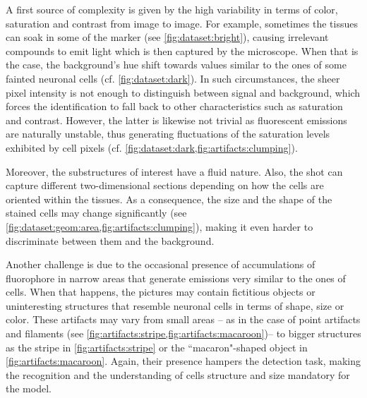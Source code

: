 A first source of complexity is given by the high variability in terms of color, saturation and contrast from image to image.
For example, sometimes the tissues can soak in some of the marker (see \cref{fig:dataset:bright}), causing irrelevant compounds to emit light which is then captured by the microscope. 
When that is the case, the background's hue shift towards values similar to the ones of some fainted neuronal cells (cf. \cref{fig:dataset:dark}).
In such circumstances, the sheer pixel intensity is not enough to distinguish between signal and background, which forces the identification to fall back to other characteristics such as saturation and contrast.
However, the latter is likewise not trivial as fluorescent emissions are naturally unstable, thus generating fluctuations of the saturation levels exhibited by cell pixels (cf. \cref{fig:dataset:dark,fig:artifacts:clumping}).

Moreover, the substructures of interest have a fluid nature. Also, the shot can capture different two-dimensional sections depending on how the cells are oriented within the tissues.
As a consequence, the size and the shape of the stained cells may change significantly (see \cref{fig:dataset:geom:area,fig:artifacts:clumping}), making it even harder to discriminate between them and the background.

Another challenge is due to the occasional presence of accumulations of fluorophore in narrow areas that generate emissions very similar to the ones of cells.
When that happens, the pictures may contain fictitious objects or uninteresting structures that resemble neuronal cells in terms of shape, size or color.
These artifacts may vary from small areas -- as in the case of point artifacts and filaments (see \cref{fig:artifacts:stripe,fig:artifacts:macaroon})-- to bigger structures as the stripe in \cref{fig:artifacts:stripe} or the ``macaron"-shaped object in \cref{fig:artifacts:macaroon}.
Again, their presence hampers the detection task, making the recognition and the understanding of cells structure and size mandatory for the model.


